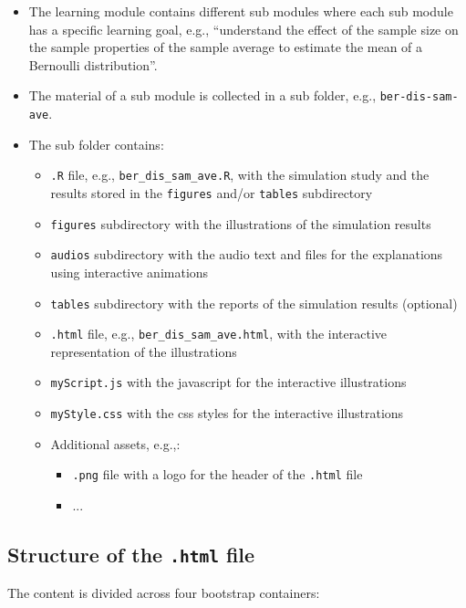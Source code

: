 \documentclass[12pt]{article}
\begin{document}
\begin{itemize}
	\item The learning module contains different sub modules where each sub module has a specific learning goal, e.g., ``understand the effect of the sample size on the sample properties of the sample average to estimate the mean of a Bernoulli distribution''.
	\item The material of a sub module is collected in a sub folder, e.g., \texttt{ber-dis-sam-ave}.
	\item The sub folder contains:
	\begin{itemize}
		\item \texttt{.R} file, e.g., \texttt{ber\_dis\_sam\_ave.R}, with the simulation study and the results stored in the \texttt{figures} and/or \texttt{tables} subdirectory
		\item \texttt{figures} subdirectory with the illustrations of the simulation results
		\item \texttt{audios} subdirectory with the audio text and files for the explanations using interactive animations
		\item \texttt{tables} subdirectory with the reports of the simulation results (optional)
		\item \texttt{.html} file, e.g., \texttt{ber\_dis\_sam\_ave.html}, with the interactive representation of the illustrations
		\item \texttt{myScript.js} with the javascript for the interactive illustrations
		\item \texttt{myStyle.css} with the css styles for the interactive illustrations
		\item Additional assets, e.g.,:
		\begin{itemize}
			\item \texttt{.png} file with a logo for the header of the \texttt{.html} file
			\item ...
		\end{itemize}
	\end{itemize}
\end{itemize}

\subsection{Structure of the \texttt{.html} file}

The content is divided across four bootstrap containers:
\end{document}
